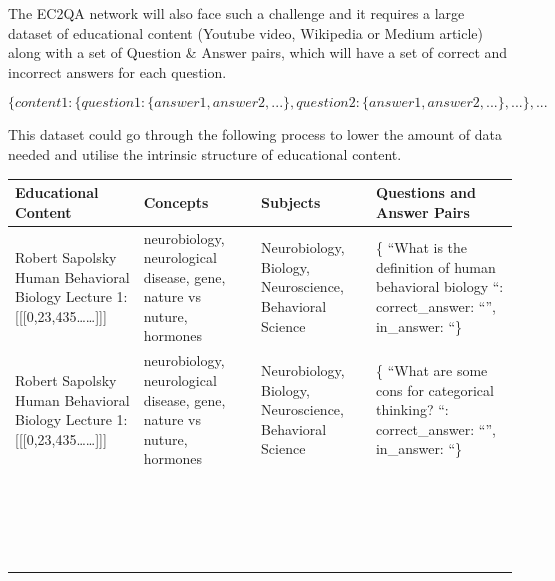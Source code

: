 \documentclass[]{book}
\theoremstyle{definition}
\theoremstyle{definition}
\theoremstyle{definition}
\theoremstyle{remark}
\begin{document}
The EC2QA network will also face such a challenge and it requires a
large dataset of educational content (Youtube video, Wikipedia or Medium
article) along with a set of Question \& Answer pairs, which will have a
set of correct and incorrect answers for each question.

\[
 \{content1: \{question1: \{answer1, answer2,...\},  question2: \{answer1, answer2,...\},...\},...
\]

This dataset could go through the following process to lower the amount
of data needed and utilise the intrinsic structure of educational
content.

\begin{tabular}{l|l|l|l}
\hline
Educational Content & Concepts & Subjects & Questions and Answer Pairs\\
\hline
Robert Sapolsky  Human Behavioral Biology Lecture 1: [[[0,23,435……]]] & neurobiology, neurological disease, gene, nature vs nuture, hormones & Neurobiology, Biology, Neuroscience, Behavioral Science & \{ “What is the definition of human behavioral biology “: correct\_answer: “”, in\_answer: “\}\\
\hline
Robert Sapolsky  Human Behavioral Biology Lecture 1: [[[0,23,435……]]] & neurobiology, neurological disease, gene, nature vs nuture, hormones & Neurobiology, Biology, Neuroscience, Behavioral Science & \{ “What are some cons for categorical thinking? “: correct\_answer: “”, in\_answer: “\}\\
\hline
 &  &  & \\
\hline
 &  &  & \\
\hline
 &  &  & \\
\hline
 &  &  & \\
\hline
 &  &  & \\
\hline
 &  &  & \\
\hline
 &  &  & \\
\hline
 &  &  & \\
\hline
 &  &  & \\
\hline
 &  &  & \\
\hline
 &  &  & \\
\hline
 &  &  & \\
\hline
 &  &  & \\
\hline
 &  &  & \\
\hline
 &  &  & \\
\hline
 &  &  & \\
\hline
 &  &  & \\
\hline
 &  &  & \\
\hline
 &  &  & \\
\hline
\end{tabular}
\end{document}
